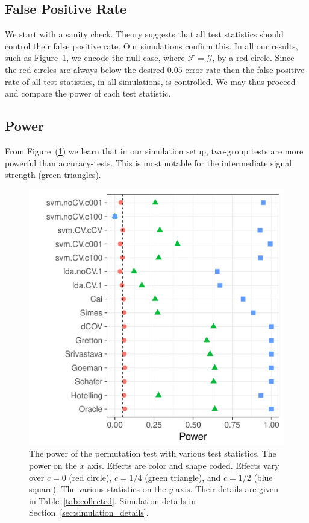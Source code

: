 \documentclass[]{bio}
\begin{document}
\subsection{False Positive Rate}
\label{sec:type_i}

We start with a sanity check. 
Theory suggests that all test statistics should control their false positive rate. 
Our simulations confirm this.
In all our results, such as Figure~\ref{fig:simulation_1}, we encode the null case, where $\mathcal{F}=\mathcal{G}$, by a red circle. 
Since the red circles are always below the desired $0.05$ error rate then the false positive rate of all test statistics, in all simulations, is controlled. 
We may thus proceed and compare the power of each test statistic. 






\subsection{Power}
\label{sec:power}

From Figure~(\ref{fig:simulation_1}) we learn that in our simulation setup, two-group tests are more powerful than accuracy-tests.
This is most notable for the intermediate signal strength (green triangles). 

\begin{figure}[h]
	\centering
	\includegraphics[width=0.7\columnwidth]{"art/file2"}
	\caption{
		The power of the permutation test with various test statistics. 
		The power on the $x$ axis. 
		Effects are color and shape coded. 
		Effects vary over $c=0$ (red circle), $c=1/4$ (green triangle), and $c=1/2$ (blue square). 
		The various statistics on the $y$ axis. 
		Their details are given in Table~\ref{tab:collected}. 
		Simulation details in Section~\ref{sec:simulation_details}.}	
	\label{fig:simulation_1}
\end{figure}
\end{document}
